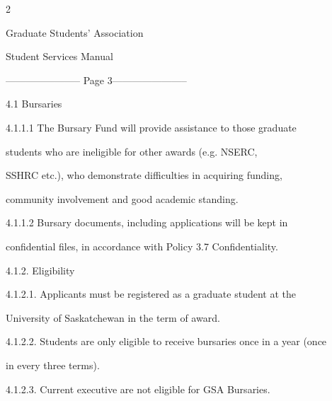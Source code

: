                                                



                                                               2  



                                   Graduate Students’ Association  



                                        Student Services Manual  



  


----------------------- Page 3-----------------------

  

  

                                       4.1      Bursaries   



4.1.1.1        The  Bursary  Fund  will  provide  assistance  to  those  graduate  

               students   who   are   ineligible   for   other   awards   (e.g.   NSERC,  

               SSHRC etc.), who demonstrate difficulties in acquiring funding,  

               community involvement and good academic standing.   



4.1.1.2        Bursary   documents,   including   applications   will   be   kept   in  

               confidential files, in accordance with Policy 3.7 Confidentiality.   



  



4.1.2. Eligibility  



4.1.2.1.     Applicants   must   be   registered   as   a   graduate   student   at   the  

             University of Saskatchewan in the term of award.   



4.1.2.2.     Students are only eligible to receive bursaries once in a year (once  

             in every three terms).   



4.1.2.3.     Current executive are not eligible for GSA Bursaries.   



